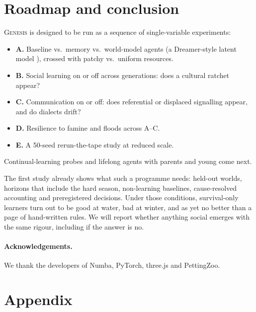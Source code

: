 \documentclass[10pt]{article}
\newcommand{\genesis}{\textsc{Genesis}}
\begin{document}
\section{Roadmap and conclusion}
\label{sec:conclusion}

\genesis{} is designed to be run as a sequence of single-variable experiments:
\begin{itemize}
\item \textbf{A.} Baseline vs.\ memory vs.\ world-model agents (a Dreamer-style latent model \citep{hafner2023dreamerv3}),
crossed with patchy vs.\ uniform resources.
\item \textbf{B.} Social learning on or off across generations: does a cultural ratchet appear?
\item \textbf{C.} Communication on or off: does referential or displaced signalling appear, and do dialects drift?
\item \textbf{D.} Resilience to famine and floods across A--C.
\item \textbf{E.} A 50-seed rerun-the-tape study at reduced scale.
\end{itemize}
Continual-learning probes \citep{kirkpatrick2017ewc,dohare2024plasticity} and lifelong agents with parents and young
come next.

The first study already shows what such a programme needs: held-out worlds, horizons that include the hard season,
non-learning baselines, cause-resolved accounting and preregistered decisions. Under those conditions, survival-only
learners turn out to be good at water, bad at winter, and as yet no better than a page of hand-written rules. We will
report whether anything social emerges with the same rigour, including if the answer is no.

\paragraph{Acknowledgements.} We thank the developers of Numba, PyTorch, three.js and PettingZoo.

{\small


}

\clearpage
\appendix
\section*{Appendix}
\end{document}
